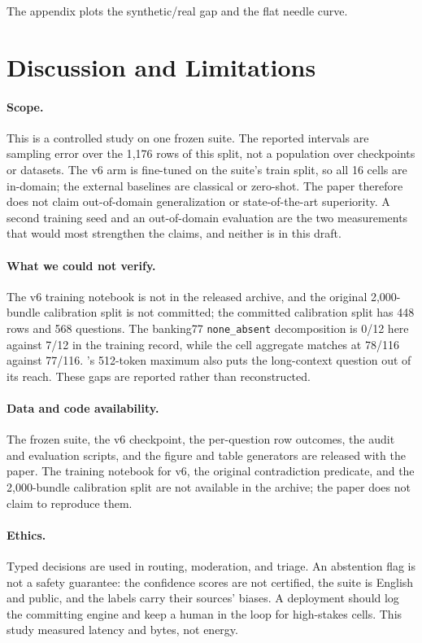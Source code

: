 The appendix plots the synthetic/real gap and the flat needle curve.

\section{Discussion and Limitations}
\label{sec:limitations}

\paragraph{Scope.}
This is a controlled study on one frozen suite. The reported intervals are sampling error over the 1{,}176 rows of this split, not a population over checkpoints or datasets. The v6 arm is fine-tuned on the suite's train split, so all 16 cells are in-domain; the external baselines are classical or zero-shot. The paper therefore does not claim out-of-domain generalization or state-of-the-art superiority. A second training seed and an out-of-domain evaluation are the two measurements that would most strengthen the claims, and neither is in this draft.

\paragraph{What we could not verify.}
The v6 training notebook is not in the released archive, and the original 2{,}000-bundle calibration split is not committed; the committed calibration split has 448 rows and 568 questions. The banking77 \texttt{none\_absent} decomposition is 0/12 here against 7/12 in the training record, while the cell aggregate matches at 78/116 against 77/116. \vsix{}'s 512-token maximum also puts the long-context question out of its reach. These gaps are reported rather than reconstructed.

\paragraph{Data and code availability.}
The frozen suite, the v6 checkpoint, the per-question row outcomes, the audit and evaluation scripts, and the figure and table generators are released with the paper. The training notebook for v6, the original contradiction predicate, and the 2{,}000-bundle calibration split are not available in the archive; the paper does not claim to reproduce them.

\paragraph{Ethics.}
Typed decisions are used in routing, moderation, and triage. An abstention flag is not a safety guarantee: the confidence scores are not certified, the suite is English and public, and the labels carry their sources' biases. A deployment should log the committing engine and keep a human in the loop for high-stakes cells. This study measured latency and bytes, not energy.

